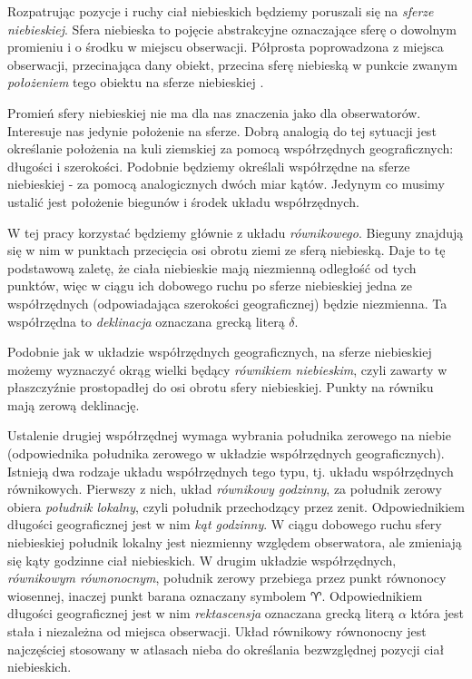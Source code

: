 Rozpatrując pozycje i ruchy ciał niebieskich będziemy poruszali się na
\emph{sferze niebieskiej}. Sfera niebieska to pojęcie abstrakcyjne oznaczające
sferę o dowolnym promieniu i o środku w miejscu obserwacji.  Półprosta
poprowadzona z miejsca obserwacji, przecinająca dany obiekt, przecina sferę
niebieską w punkcie zwanym \emph{położeniem} tego obiektu na sferze niebieskiej
\cite{rybka}.

Promień sfery niebieskiej nie ma dla nas znaczenia jako dla obserwatorów.
Interesuje nas jedynie położenie na sferze. Dobrą analogią do tej sytuacji jest
określanie położenia na kuli ziemskiej za pomocą współrzędnych geograficznych:
długości i szerokości. Podobnie będziemy określali współrzędne na sferze
niebieskiej - za pomocą analogicznych dwóch miar kątów. Jedynym co musimy
ustalić jest położenie biegunów i środek układu współrzędnych.

W tej pracy korzystać będziemy głównie z układu \emph{równikowego}. Bieguny
znajdują się w nim w punktach przecięcia osi obrotu ziemi ze sferą niebieską.
Daje to tę podstawową zaletę, że ciała niebieskie mają niezmienną odległość od
tych punktów, więc w ciągu ich dobowego ruchu po sferze niebieskiej jedna ze
współrzędnych (odpowiadająca szerokości geograficznej) będzie niezmienna. Ta
współrzędna to \emph{deklinacja} oznaczana grecką literą $\delta$.

Podobnie jak w układzie współrzędnych geograficznych, na sferze niebieskiej
możemy wyznaczyć okrąg wielki będący \emph{równikiem niebieskim}, czyli zawarty
w płaszczyźnie prostopadłej do osi obrotu sfery niebieskiej. Punkty na równiku
mają zerową deklinację.

Ustalenie drugiej współrzędnej wymaga wybrania południka zerowego na niebie
(odpowiednika południka zerowego w układzie współrzędnych geograficznych).
Istnieją dwa rodzaje układu współrzędnych tego typu, tj. układu współrzędnych
równikowych.  Pierwszy z nich, układ \emph{równikowy godzinny}, za południk
zerowy obiera \emph{południk lokalny}, czyli południk przechodzący przez zenit.
Odpowiednikiem długości geograficznej jest w nim \emph{kąt godzinny}. W ciągu
dobowego ruchu sfery niebieskiej południk lokalny jest niezmienny względem
obserwatora, ale zmieniają się kąty godzinne ciał niebieskich. W drugim układzie
współrzędnych, \emph{równikowym równonocnym}, południk zerowy przebiega przez
punkt równonocy wiosennej, inaczej punkt barana oznaczany symbolem $\aries$.
Odpowiednikiem długości geograficznej jest w nim \emph{rektascensja} oznaczana
grecką literą $\alpha$ która jest stała i niezależna od miejsca obserwacji.
Układ równikowy równonocny jest najczęściej stosowany w atlasach nieba do
określania bezwzględnej pozycji ciał niebieskich.

